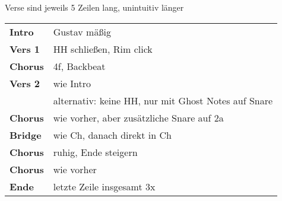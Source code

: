 
Verse sind jeweils 5 Zeilen lang, unintuitiv länger

\begin{tabular}{p{1.6cm}l}
	\textbf{Intro}  & Gustav mäßig                                        \\
	\textbf{Vers 1} & HH schließen, Rim click                             \\
	\textbf{Chorus} & 4f, Backbeat                                        \\ %
	\textbf{Vers 2} & wie Intro                                           \\
	                & alternativ: keine HH, nur mit Ghost Notes auf Snare \\
	\textbf{Chorus} & wie vorher, aber zusätzliche Snare auf 2a           \\
	\textbf{Bridge} & wie Ch, danach direkt in Ch                         \\
	\textbf{Chorus} & ruhig, Ende steigern                                \\
	\textbf{Chorus} & wie vorher                                          \\
	\textbf{Ende}   & letzte Zeile insgesamt 3x                           \\
\end{tabular}
